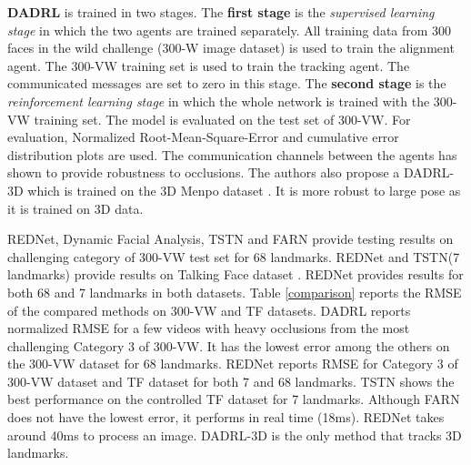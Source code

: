 \documentclass{llncs}
\begin{document}
	\textbf{DADRL} \cite{dadrl} is trained in two stages. The \textbf{first stage} is the \textit{supervised learning stage} in which the two agents are trained separately. All training data from 300 faces in the wild challenge (300-W image dataset) is used to train the alignment agent. The 300-VW training set is used to train the tracking agent. The communicated messages are set to zero in this stage. The \textbf{second stage} is the \textit{reinforcement learning stage} in which the whole network is trained with the 300-VW training set. The model is evaluated on the test set of 300-VW. For evaluation, Normalized Root-Mean-Square-Error and cumulative error distribution plots are used. The communication channels between the agents has shown to provide robustness to occlusions. The authors also propose a DADRL-3D which is trained on the 3D Menpo dataset \cite{3d_menpo}. It is more robust to large pose as it is trained on 3D data.
	

	
	REDNet\cite{rednet}, Dynamic Facial Analysis\cite{dynamic_facial_analysis}, TSTN\cite{tstn} and FARN\cite{farn} provide testing results on challenging category of 300-VW test set for 68 landmarks. REDNet\cite{rednet} and TSTN\cite{tstn}(7 landmarks) provide results on Talking Face dataset \cite{tf}. REDNet\cite{rednet} provides results for both 68 and 7 landmarks in both datasets.
	Table \ref{comparison} reports the RMSE of the compared methods on 300-VW and TF\cite{tf} datasets.
	DADRL\cite{dadrl} reports normalized RMSE for a few videos with heavy occlusions from the most challenging Category 3 of 300-VW. It has the lowest error among the others on the 300-VW dataset for 68 landmarks.
	REDNet\cite{rednet} reports RMSE for Category 3 of 300-VW dataset and TF dataset for both 7 and 68 landmarks. TSTN\cite{tstn} shows the best performance on the controlled TF dataset for 7 landmarks. Although FARN\cite{farn} does not have the lowest error, it performs in real time (18ms). REDNet\cite{rednet} takes around 40ms to process an image. DADRL-3D is the only method that tracks 3D landmarks.
	
\end{document}
